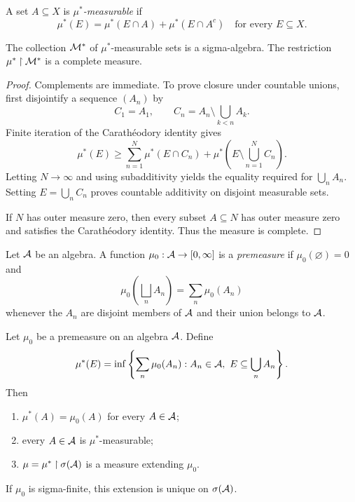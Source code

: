 \begin{de}
A set $A\subseteq X$ is \emph{$\mu^*$-measurable} if
\[
\mu^*(E)=\mu^*(E\cap A)+\mu^*(E\cap A^c)
\quad\text{for every }E\subseteq X.
\]
\end{de}

\begin{thm}
The collection $\mathcal{M}^*$ of $\mu^*$-measurable sets is a sigma-algebra. The restriction $\mu^*\mathbin{\upharpoonright}\mathcal{M}^*$ is a complete measure.
\end{thm}

\begin{proof}
Complements are immediate. To prove closure under countable unions, first disjointify a sequence $(A_n)$ by
\[
C_1=A_1,\qquad C_n=A_n\setminus\bigcup_{k<n}A_k.
\]
Finite iteration of the Carath\'eodory identity gives
\[
\mu^*(E)\geq
 \sum_{n=1}^N\mu^*(E\cap C_n)
 +\mu^*\left(E\setminus\bigcup_{n=1}^NC_n\right).
\]
Letting $N\to\infty$ and using subadditivity yields the equality required for $\bigcup_nA_n$. Setting $E=\bigcup_nC_n$ proves countable additivity on disjoint measurable sets.

If $N$ has outer measure zero, then every subset $A\subseteq N$ has outer measure zero and satisfies the Carath\'eodory identity. Thus the measure is complete.
\end{proof}

\begin{de}[Premeasure]
Let $\mathcal{A}$ be an algebra. A function $\mu_0:\mathcal{A}\to[0,\infty]$ is a \emph{premeasure} if $\mu_0(\varnothing)=0$ and
\[
\mu_0\left(\bigsqcup_nA_n\right)=\sum_n\mu_0(A_n)
\]
whenever the $A_n$ are disjoint members of $\mathcal{A}$ and their union belongs to $\mathcal{A}$.
\end{de}

\begin{thm}
Let $\mu_0$ be a premeasure on an algebra $\mathcal{A}$. Define
\[
\mu^*(E)=\inf\left\{\sum_n\mu_0(A_n):
 A_n\in\mathcal{A},\ E\subseteq\bigcup_nA_n\right\}.
\]
Then
\begin{enumerate}
  \item $\mu^*(A)=\mu_0(A)$ for every $A\in\mathcal{A}$;
  \item every $A\in\mathcal{A}$ is $\mu^*$-measurable;
  \item $\mu=\mu^*\mathbin{\upharpoonright}\sigma(\mathcal{A})$ is a measure extending $\mu_0$.
\end{enumerate}
If $\mu_0$ is sigma-finite, this extension is unique on $\sigma(\mathcal{A})$.
\end{thm}

